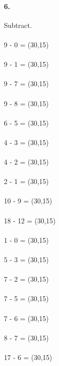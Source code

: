 \documentclass[12pt]{article}
\begin{document}
\paragraph{6.}
Subtract.
\\
\\
9 - 0 = \framebox(30,15){}
\\
\\
9 - 1 = \framebox(30,15){}
\\
\\
9 - 7 = \framebox(30,15){}
\\
\\
9 - 8 = \framebox(30,15){}
\\
\\
6 - 5 = \framebox(30,15){}
\\
\\
4 - 3 = \framebox(30,15){}
\\
\\
4 - 2 = \framebox(30,15){}
\\
\\
2 - 1 = \framebox(30,15){}
\\
\\
10 - 9 = \framebox(30,15){}
\\
\\
18 - 12 = \framebox(30,15){}
\\
\\
1 - 0 = \framebox(30,15){}
\\
\\
5 - 3 = \framebox(30,15){}
\\
\\
7 - 2 = \framebox(30,15){}
\\
\\
7 - 5 = \framebox(30,15){}
\\
\\
7 - 6 = \framebox(30,15){}
\\
\\
8 - 7 = \framebox(30,15){}
\\
\\
17 - 6 = \framebox(30,15){}
\end{document}
